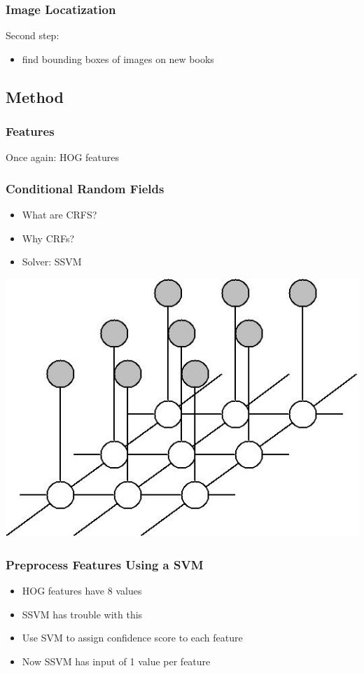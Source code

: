 
\begin{frame}
\frametitle{Image Locatization}
Second step:
\begin{itemize}
\item find bounding boxes of images on new books
\end{itemize}
\end{frame}

\subsection{Method}
\begin{frame}
\frametitle{Features}
Once again: HOG features
\end{frame}

\begin{frame}
\frametitle{Conditional Random Fields}
\begin{itemize}
\item What are CRFS?
\item Why CRFs?
\item Solver: SSVM
\end{itemize}
\includegraphics[width=.5\paperwidth]{resources/crf}
\end{frame}

\begin{frame}
\frametitle{Preprocess Features Using a SVM}
\begin{itemize}
\item HOG features have 8 values
\item SSVM has trouble with this
\item Use SVM to assign confidence score to each feature
\item Now SSVM has input of 1 value per feature
\end{itemize}
\end{frame}


